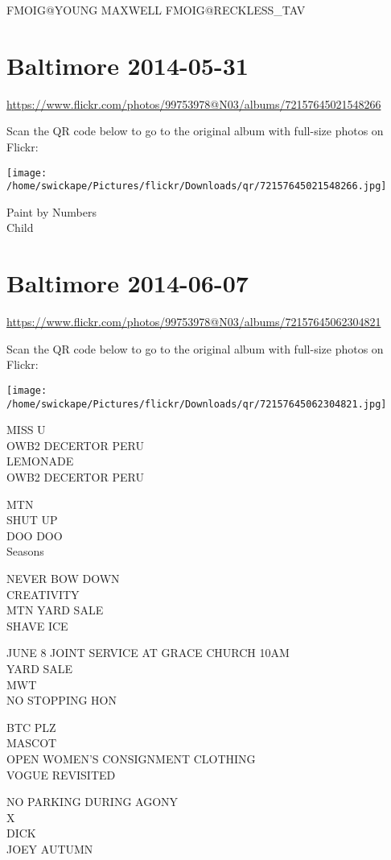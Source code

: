 \documentclass[10pt,letterpaper]{article}
\begin{document}
FMOIG@YOUNG MAXWELL FMOIG@RECKLESS\_TAV


\section*{Baltimore 2014-05-31}

\url{https://www.flickr.com/photos/99753978@N03/albums/72157645021548266}

Scan the QR code below to go to the original album with full-size photos on Flickr:

\texttt{[image: /home/swickape/Pictures/flickr/Downloads/qr/72157645021548266.jpg]}


Paint by Numbers\\
Child


\section*{Baltimore 2014-06-07}

\url{https://www.flickr.com/photos/99753978@N03/albums/72157645062304821}

Scan the QR code below to go to the original album with full-size photos on Flickr:

\texttt{[image: /home/swickape/Pictures/flickr/Downloads/qr/72157645062304821.jpg]}


MISS U\\
OWB2 DECERTOR PERU\\
LEMONADE\\
OWB2 DECERTOR PERU

MTN\\
SHUT UP\\
DOO DOO\\
Seasons

NEVER BOW DOWN\\
CREATIVITY\\
MTN YARD SALE\\
SHAVE ICE

JUNE 8 JOINT SERVICE AT GRACE CHURCH 10AM\\
YARD SALE\\
MWT\\
NO STOPPING HON

BTC PLZ\\
MASCOT\\
OPEN WOMEN'S CONSIGNMENT CLOTHING\\
VOGUE REVISITED

NO PARKING DURING AGONY\\
X\\
DICK\\
JOEY AUTUMN
\end{document}
